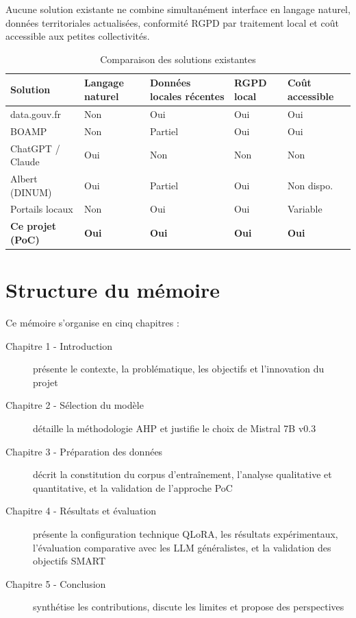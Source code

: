 Aucune solution existante ne combine simultanément interface en langage naturel, données territoriales actualisées, conformité RGPD par traitement local et coût accessible aux petites collectivités.

\begin{table}[htbp]
\centering
\small
\caption{Comparaison des solutions existantes}
\label{tab:analyse_existant}
\begin{tabular}{@{}lp{1.8cm}p{2.4cm}p{1.8cm}p{2cm}@{}}
\toprule
\textbf{Solution} & \textbf{Langage naturel} & \textbf{Données locales récentes} & \textbf{RGPD local} & \textbf{Coût accessible} \\ \midrule
data.gouv.fr & Non & Oui & Oui & Oui \\
BOAMP & Non & Partiel & Oui & Oui \\
ChatGPT / Claude & Oui & Non & Non & Non \\
Albert (DINUM) & Oui & Partiel & Oui & Non dispo. \\
Portails locaux & Non & Oui & Oui & Variable \\
\midrule
\textbf{Ce projet (PoC)} & \textbf{Oui} & \textbf{Oui} & \textbf{Oui} & \textbf{Oui} \\
\bottomrule
\end{tabular}
\end{table}

\section{Structure du mémoire}

Ce mémoire s'organise en cinq chapitres :

\begin{description}
    \item[Chapitre 1 - Introduction] présente le contexte, la problématique, les objectifs et l'innovation du projet
    
    \item[Chapitre 2 - Sélection du modèle] détaille la méthodologie AHP et justifie le choix de Mistral 7B v0.3
    
    \item[Chapitre 3 - Préparation des données] décrit la constitution du corpus d'entraînement, l'analyse qualitative et quantitative, et la validation de l'approche PoC
    
    \item[Chapitre 4 - Résultats et évaluation] présente la configuration technique QLoRA, les résultats expérimentaux, l'évaluation comparative avec les LLM généralistes, et la validation des objectifs SMART
    
    \item[Chapitre 5 - Conclusion] synthétise les contributions, discute les limites et propose des perspectives
\end{description}
